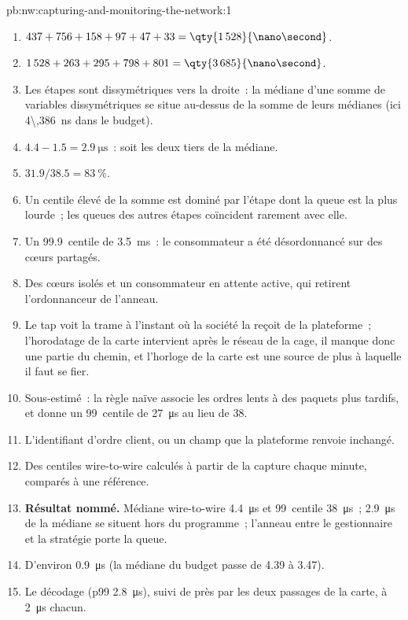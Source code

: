 \begin{solution}{pb:nw:capturing-and-monitoring-the-network:1}
\begin{enumerate}
\item $437 + 756 + 158 + 97 + 47 + 33 = \qty{1\,528}{\nano\second}$.
\item $1\,528 + 263 + 295 + 798 + 801 = \qty{3\,685}{\nano\second}$.
\item Les étapes sont dissymétriques vers la droite~: la médiane d'une somme de variables dissymétriques se situe au-dessus de la somme de leurs médianes (ici
  \qty{4\,386}{\nano\second} dans le budget).
\item $4.4 - 1.5 = \qty{2.9}{\micro\second}$~: soit les deux tiers de la médiane.
\item $31.9 / 38.5 = 83~\%$.
\item Un centile élevé de la somme est dominé par l'étape dont la queue est la plus lourde~; les queues des autres étapes coïncident rarement avec elle.
\item Un 99.9~centile de \qty{3.5}{\milli\second}~: le consommateur a été désordonnancé sur des cœurs partagés.
\item Des cœurs isolés et un consommateur en attente active, qui retirent l'ordonnanceur de l'anneau.
\item Le tap voit la trame à l'instant où la société la reçoit de la plateforme~; l'horodatage de la carte intervient après le réseau de la cage, il manque donc
  une partie du chemin, et l'horloge de la carte est une source de plus à laquelle il faut se fier.
\item Sous-estimé~: la règle naïve associe les ordres lents à des paquets plus tardifs, et donne un 99~centile de \qty{27}{\micro\second} au lieu de 38.
\item L'identifiant d'ordre client, ou un champ que la plateforme renvoie inchangé.
\item Des centiles wire-to-wire calculés à partir de la capture chaque minute, comparés à une référence.
\item \textbf{Résultat nommé.} Médiane wire-to-wire \qty{4.4}{\micro\second} et 99~centile \qty{38}{\micro\second}~; \qty{2.9}{\micro\second} de la
  médiane se situent hors du programme~; l'anneau entre le gestionnaire et la stratégie porte la queue.
\item D'environ \qty{0.9}{\micro\second} (la médiane du budget passe de 4.39 à 3.47).
\item Le décodage (p99 \qty{2.8}{\micro\second}), suivi de près par les deux passages de la carte, à \qty{2}{\micro\second} chacun.

\end{enumerate}
\end{solution}
